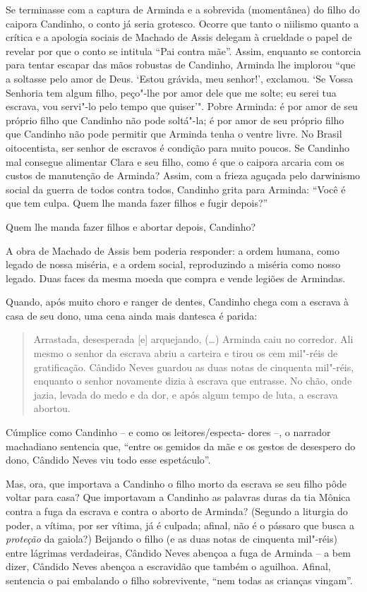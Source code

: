 Se terminasse com a captura de Arminda e a sobrevida (momentânea) do
filho do caipora Candinho, o conto já seria grotesco. Ocorre que tanto o
niilismo quanto a crítica e a apologia sociais de Machado de Assis
delegam à crueldade o papel de revelar por que o conto se intitula ``Pai
contra mãe''. Assim, enquanto se contorcia para tentar escapar das mãos
robustas de Candinho, Arminda lhe implorou ``que a soltasse pelo amor de
Deus. `Estou grávida, meu senhor!', exclamou. `Se Vossa Senhoria tem
algum filho, peço"-lhe por amor dele que me solte; eu serei tua escrava,
vou servi"-lo pelo tempo que quiser'". Pobre Arminda: é por amor de seu
próprio filho que Candinho não pode soltá"-la; é por amor de seu próprio
filho que Candinho não pode permitir que Arminda tenha o ventre livre.
No Brasil oitocentista, ser senhor de escravos é condição para muito
poucos. Se Candinho mal consegue alimentar Clara e seu filho, como é que
o caipora arcaria com os custos de manutenção de Arminda? Assim, com a
frieza aguçada pelo darwinismo social da guerra de todos contra todos,
Candinho grita para Arminda: ``Você é que tem culpa. Quem lhe manda
fazer filhos e fugir depois?''

Quem lhe manda fazer filhos e abortar depois, Candinho?

A obra de Machado de Assis bem poderia responder: a ordem humana, como
legado de nossa miséria, e a ordem social, reproduzindo a miséria como
nosso legado. Duas faces da mesma moeda que compra e vende legiões de
Armindas.

Quando, após muito choro e ranger de dentes, Candinho chega com a
escrava à casa de seu dono, uma cena ainda mais dantesca é parida:

\begin{quote}
Arrastada, desesperada {[}e{]} arquejando, (\ldots{}) Arminda caiu no
corredor. Ali mesmo o senhor da escrava abriu a carteira e tirou os cem
mil"-réis de gratificação. Cândido Neves guardou as duas notas de
cinquenta mil"-réis, enquanto o senhor novamente dizia à escrava que
entrasse. No chão, onde jazia, levada do medo e da dor, e após algum
tempo de luta, a escrava abortou.
\end{quote}

Cúmplice como Candinho -- e como os leitores/especta-
dores
--, o narrador
machadiano sentencia que, ``entre os gemidos da mãe e os gestos de
desespero do dono, Cândido Neves viu todo esse espetáculo''.

Mas, ora, que importava a Candinho o filho morto da escrava se seu filho
pôde voltar para casa? Que importavam a Candinho as palavras duras da
tia Mônica contra a fuga da escrava e contra o aborto de Arminda?
(Segundo a liturgia do poder, a vítima, por ser vítima, já é culpada;
afinal, não é o pássaro que busca a \emph{proteção} da gaiola?) Beijando
o filho (e as duas notas de cinquenta mil"-réis) entre lágrimas
verdadeiras, Cândido Neves abençoa a fuga de Arminda -- a bem dizer,
Cândido Neves abençoa a escravidão que também o aguilhoa. Afinal,
sentencia o pai embalando o filho sobrevivente, ``nem todas as crianças
vingam''.

